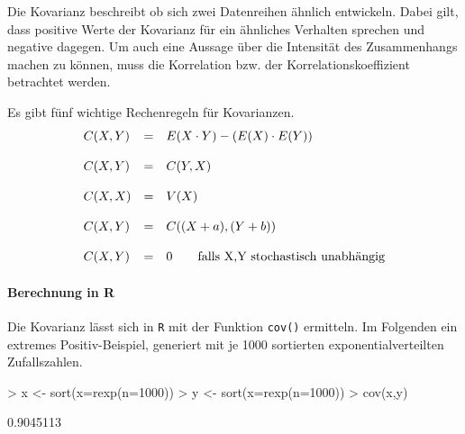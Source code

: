 Die \gls{Kovarianz} beschreibt ob sich zwei Datenreihen ähnlich 
entwickeln. Dabei gilt, dass positive Werte der Kovarianz für ein 
ähnliches Verhalten sprechen und negative dagegen. Um auch eine
Aussage über die Intensität des Zusammenhangs machen zu können,
muss die Korrelation bzw. der Korrelationskoeffizient betrachtet 
werden.

Es gibt fünf wichtige Rechenregeln für Kovarianzen.
\[ \begin{array}{l c l}
	C(X,Y) 
		& =
		& E(X \cdot Y) - (E(X) \cdot E(Y)) \\
	& & \\
	C(X,Y) 
		& =
		& C(Y,X) \\
	& & \\
	C(X,X) 
		& =
		& V(X) \\
	& & \\
	C(X,Y)
		& = 
		& C((X+a),(Y+b)) \\
	& & \\
	C(X,Y) 
		& =
		& 0 \qquad \text{falls } $X,Y$ \text{ stochastisch unabhängig} \\
\end{array} \]

\paragraph{Berechnung in R}
Die Kovarianz lässt sich in \lstinline{R} mit der Funktion 
\lstinline{cov()} ermitteln. Im Folgenden ein extremes 
Positiv-Beispiel, generiert mit je 1000 sortierten 
exponentialverteilten Zufallszahlen. 
\begin{Schunk}
\begin{Sinput}
> x <- sort(x=rexp(n=1000))
> y <- sort(x=rexp(n=1000))
> cov(x,y)
\end{Sinput}
\begin{Soutput}
[1] 0.9045113
\end{Soutput}
\end{Schunk}

